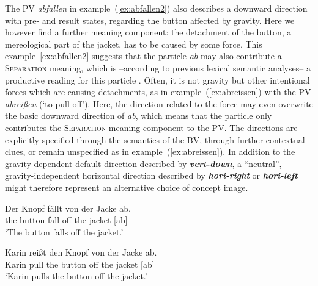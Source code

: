 \documentclass[output=paper]{langsci/langscibook}
\newcommand{\textci}[1]{\textit{\textbf{#1}}}
\begin{document}
The PV \textit{abfallen} in example~(\ref{ex:abfallen2}) also
describes a downward direction with pre- and result states, regarding
the button affected by gravity. Here we however find a further meaning
component: the detachment of the button, a mereological part of the
jacket, has to be caused by some force. This
example~\ref{ex:abfallen2} suggests that the particle \textit{ab} may
also contribute a \textsc{Separation} meaning, which is --according to
previous lexical semantic analyses-- a productive reading for this
particle \citep{Kliche:11}. Often, it is not gravity but other
intentional forces which are causing detachments, as in
example~(\ref{ex:abreissen}) with the PV \textit{abreißen} (`to pull
off'). Here, the direction related to the force may even overwrite the
basic downward direction of \textit{ab}, which means that the particle
only contributes the \textsc{Separation} meaning component to the
PV. The directions are explicitly specified through the semantics of
the BV, through further contextual clues, or remain unspecified as in
example~(\ref{ex:abreissen}). In addition to the gravity-dependent
default direction described by \textci{vert-down}, a ``neutral'',
gravity-independent horizontal direction described by
\textci{hori-right} or \textci{hori-left} might therefore represent an
alternative choice of concept image.

\ea\label{ex:abfallen2}
\gll Der Knopf fällt von der Jacke ab.\\
the button fall off the jacket [ab]\\
\glt `The button falls off the jacket.'  
\z

\ea\label{ex:abreissen}
\gll Karin reißt den Knopf von der Jacke ab.\\
Karin pull the button off the jacket [ab]\\
\glt `Karin pulls the button off the jacket.'
\z
\end{document}
